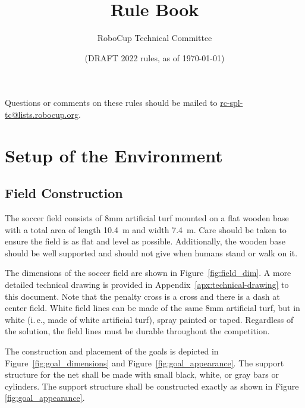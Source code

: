 \documentclass[12pt]{article}
\title{\leaguename Rule Book}
\author{RoboCup Technical Committee}
\date{(DRAFT 2022 rules, as of \today)}
\newcommand{\ie}{\mbox{i.\,e.}\xspace}
\newcommand{\TotalWidth}{7.4~m\xspace}
\newcommand{\TotalLength}{10.4~m\xspace }
\begin{document}
\maketitle

\begin{center}
Questions or comments on these rules should be mailed to \url{rc-spl-tc@lists.robocup.org}.
\end{center}

\vfill

\tableofcontents
\setcounter{tocdepth}{3}

\thispagestyle{fancy}

\clearpage

\cfoot{\thepage}
\setcounter{page}{1}

\newpage

\section{Setup of the Environment}

\subsection{Field Construction}
\label{sec:field_dim}

The soccer field consists of 8mm artificial turf mounted on a flat wooden base with a total area of length \TotalLength and width \TotalWidth.  Care should be taken to ensure the field is as flat and level as possible.  Additionally, the wooden base should be well supported and should not give when humans stand or walk on it.

The dimensions of the soccer field are shown in Figure~\ref{fig:field_dim}.
A more detailed technical drawing is provided in Appendix~\ref{apx:technical-drawing} to this document.
Note that the penalty cross is a cross and there is a dash at center field. White field lines can be made of the same 8mm artificial turf, but in white (\ie, made of white artificial turf), spray painted or taped. Regardless of the solution, the field lines must be durable throughout the competition.

The construction and placement of the goals is depicted in Figure~\ref{fig:goal_dimensions} and Figure~\ref{fig:goal_appearance}. The support structure for the net shall be made with small black, white, or gray bars or cylinders.  The support structure shall be constructed exactly as shown in Figure \ref{fig:goal_appearance}.
\end{document}
